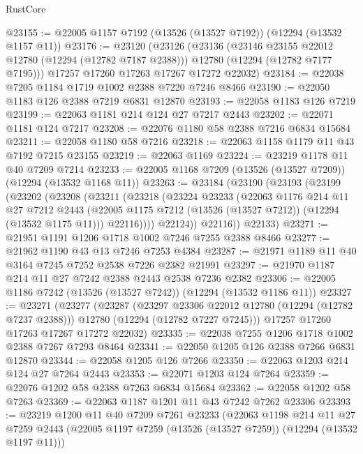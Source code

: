 \begin{lexlean}{RustCore}
\begin{coremodule}
@23155 := @22005 @1157 @7192 (@13526 (@13527 @7192)) (@12294 (@13532 @1157 @11))
@23176 := @23120
    (@23126
      (@23136
        (@23146 @23155 @22012 @12780 (@12294 (@12782 @7187 @2388)))
        @12780
        (@12294 (@12782 @7177 @7195)))
      @17257
      @17260
      @17263
      @17267
      @17272
      @22032)
@23184 := @22038 @7205 @1184 @1719 @1002 @2388 @7220 @7246 @8466
@23190 := @22050 @1183 @126 @2388 @7219 @6831 @12870
@23193 := @22058 @1183 @126 @7219
@23199 := @22063 @1181 @214 @124 @27 @7217 @2443
@23202 := @22071 @1181 @124 @7217
@23208 := @22076 @1180 @58 @2388 @7216 @6834 @15684
@23211 := @22058 @1180 @58 @7216
@23218 := @22063 @1158 @1179 @11 @43 @7192 @7215 @23155
@23219 := @22063 @1169
@23224 := @23219 @1178 @11 @40 @7209 @7214
@23233 := @22005 @1168 @7209 (@13526 (@13527 @7209)) (@12294 (@13532 @1168 @11))
@23263 := @23184
    (@23190
      (@23193
        (@23199
          (@23202
            (@23208
              (@23211
                (@23218
                  (@23224
                    @23233
                    (@22063
                      @1176
                      @214
                      @11
                      @27
                      @7212
                      @2443
                      (@22005 @1175 @7212 (@13526 (@13527 @7212)) (@12294 (@13532 @1175 @11)))
                      @22116))))
              @22124))
          @22116))
      @22133)
@23271 := @21951 @1191 @1206 @1718 @1002 @7246 @7255 @2388 @8466
@23277 := @21962 @1190 @43 @13 @7246 @7253 @4384
@23287 := @21971 @1189 @11 @40 @3164 @7245 @7252 @2538 @7226 @2382 @21991
@23297 := @21970 @1187 @214 @11 @27 @7242 @2388 @2443 @2538 @7236 @2382
@23306 := @22005 @1186 @7242 (@13526 (@13527 @7242)) (@12294 (@13532 @1186 @11))
@23327 := @23271
    (@23277
      (@23287
        (@23297 @23306 @22012 @12780 (@12294 (@12782 @7237 @2388)))
        @12780
        (@12294 (@12782 @7227 @7245)))
      @17257
      @17260
      @17263
      @17267
      @17272
      @22032)
@23335 := @22038 @7255 @1206 @1718 @1002 @2388 @7267 @7293 @8464
@23341 := @22050 @1205 @126 @2388 @7266 @6831 @12870
@23344 := @22058 @1205 @126 @7266
@23350 := @22063 @1203 @214 @124 @27 @7264 @2443
@23353 := @22071 @1203 @124 @7264
@23359 := @22076 @1202 @58 @2388 @7263 @6834 @15684
@23362 := @22058 @1202 @58 @7263
@23369 := @22063 @1187 @1201 @11 @43 @7242 @7262 @23306
@23393 := @23219
    @1200
    @11
    @40
    @7209
    @7261
    @23233
    (@22063
      @1198
      @214
      @11
      @27
      @7259
      @2443
      (@22005 @1197 @7259 (@13526 (@13527 @7259)) (@12294 (@13532 @1197 @11)))

\end{coremodule}
\end{lexlean}
